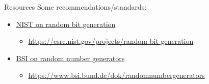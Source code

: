 \begin{frame}{Resources}
  Some recommendations/standards:
  \begin{itemize}
    \item \href{https://csrc.nist.gov/projects/random-bit-generation}{NIST on random bit generation}
    \begin{itemize}
      \item \url{https://csrc.nist.gov/projects/random-bit-generation}
    \end{itemize}
    \item \href{https://www.bsi.bund.de/dok/randomnumbergenerators}{BSI on random number generators}
    \begin{itemize}
      \item \url{https://www.bsi.bund.de/dok/randomnumbergenerators}
    \end{itemize}
  \end{itemize}
\end{frame}





